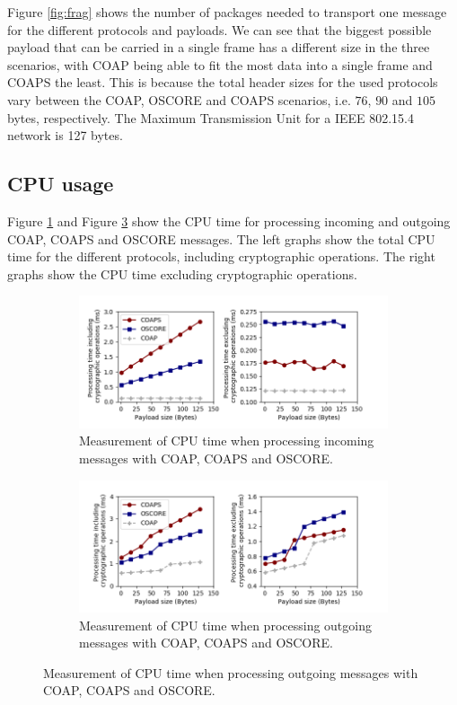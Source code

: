 {Figure \ref{fig:frag} shows the number of packages needed to transport one message for the different protocols and payloads. We can see that the biggest possible payload that can be carried in a single frame has a different size in the three scenarios, with COAP being able to fit the most data into a single frame and COAPS the least. This is because the total header sizes for the used protocols vary between the COAP, OSCORE and COAPS scenarios, i.e. $76$, $90$ and $105$ bytes, respectively. The Maximum Transmission Unit for a IEEE 802.15.4 network is 127 bytes.

\subsection{CPU usage}
Figure \ref{fig:parse} and Figure \ref{fig:serialize} show the CPU time for processing incoming and outgoing COAP, COAPS and OSCORE messages. The left graphs show the total CPU time for the different protocols, including cryptographic operations. The right graphs show the CPU time excluding cryptographic operations.
\begin{figure}[ht]
\begin{subfigure}{1.0\textwidth}
\centering
\includegraphics[width=1.0\textwidth]{papers/oscore/images/proc.png}
\caption[Processing measurements]{Measurement of CPU time when processing incoming messages with COAP, COAPS and OSCORE. }
\label{fig:parse}
\end{subfigure}

\begin{subfigure}[ht]{1.0\textwidth}
\centering
\includegraphics[width=1.0\textwidth]{papers/oscore/images/serialize.png}
\caption[Processing measurements]{Measurement of CPU time when processing outgoing messages with COAP, COAPS and OSCORE. }
\label{fig:serialize}
\end{subfigure}
\end{figure}

}
